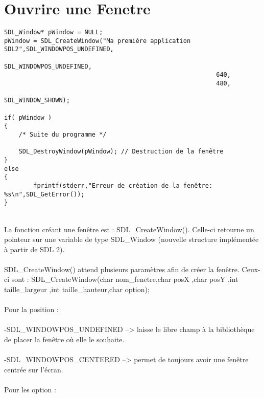 \documentclass[a4paper,12pt,openany]{book}
\begin{document}
\section{Ouvrire une Fenetre}
\begin{verbatim}
SDL_Window* pWindow = NULL;
pWindow = SDL_CreateWindow("Ma première application SDL2",SDL_WINDOWPOS_UNDEFINED,
                                                          SDL_WINDOWPOS_UNDEFINED,
                                                          640,
                                                          480,
                                                          SDL_WINDOW_SHOWN);

if( pWindow )
{
    /* Suite du programme */

    SDL_DestroyWindow(pWindow); // Destruction de la fenêtre
}
else
{
        fprintf(stderr,"Erreur de création de la fenêtre: %s\n",SDL_GetError());
}
\end{verbatim}
\\
La fonction créant une fenêtre est : SDL_CreateWindow(). Celle-ci retourne un pointeur sur une variable de type SDL_Window (nouvelle structure implémentée à partir de SDL 2).\\
\\
SDL_CreateWindow() attend plusieurs paramètres afin de créer la fenêtre. Ceux-ci sont :
SDL_CreateWindow(char nom_fenetre,char posX ,char posY ,int taille_largeur ,int taille_hauteur,char option);\\
\\
Pour la position : \\
\\
-SDL_WINDOWPOS_UNDEFINED --> laisse le libre champ à la bibliothèque de placer la fenêtre où elle le souhaite.\\
\\ 
-SDL_WINDOWPOS_CENTERED --> permet de toujours avoir une fenêtre centrée sur l'écran.\\
\\
Pour les option :\\
\\
\end{document}
